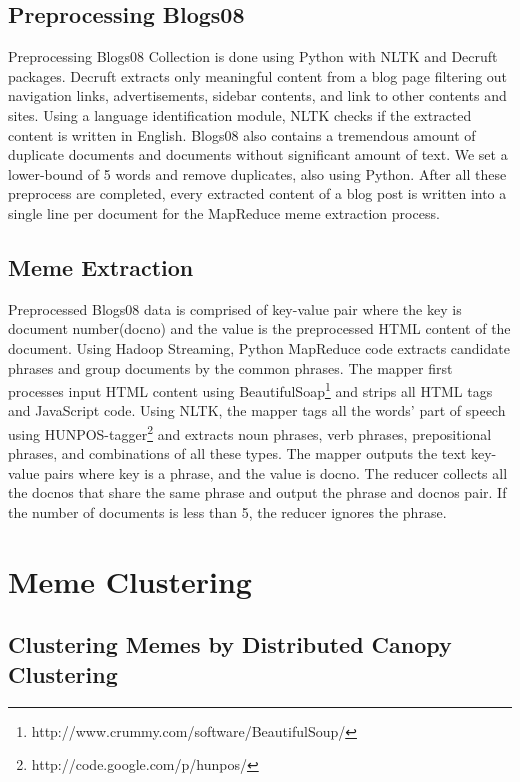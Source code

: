 \documentclass{sig-alternate}
\begin{document}
\subsection{Preprocessing Blogs08}

Preprocessing Blogs08 Collection is done using Python with NLTK and Decruft packages. Decruft extracts only meaningful content from a blog page filtering out navigation links, advertisements, sidebar contents, and link to other contents and sites. Using a language identification module, NLTK checks if the extracted content is written in English. Blogs08 also contains a tremendous amount of duplicate documents and documents without significant amount of text. We set a lower-bound of 5 words and remove duplicates, also using Python. After all these preprocess are completed, every extracted content of a blog post is written into a single line per document for the MapReduce meme extraction process.

\subsection{Meme Extraction}

Preprocessed Blogs08 data is comprised of key-value pair where the key is document number(docno) and the value is the preprocessed HTML content of the document. Using Hadoop Streaming, Python MapReduce code extracts candidate phrases and group documents by the common phrases. The mapper first processes input HTML content using BeautifulSoap\footnote{http://www.crummy.com/software/BeautifulSoup/} and strips all HTML tags and JavaScript code. Using NLTK, the mapper tags all the words' part of speech using HUNPOS-tagger\footnote{http://code.google.com/p/hunpos/} and extracts noun phrases, verb phrases, prepositional phrases, and combinations of all these types. The mapper outputs the text key-value pairs where key is a phrase, and the value is docno. The reducer collects all the docnos that share the same phrase and output the phrase and docnos pair. If the number of documents is less than 5, the reducer ignores the phrase.

\section{Meme Clustering}

\subsection{Clustering Memes by Distributed Canopy Clustering}
\end{document}

